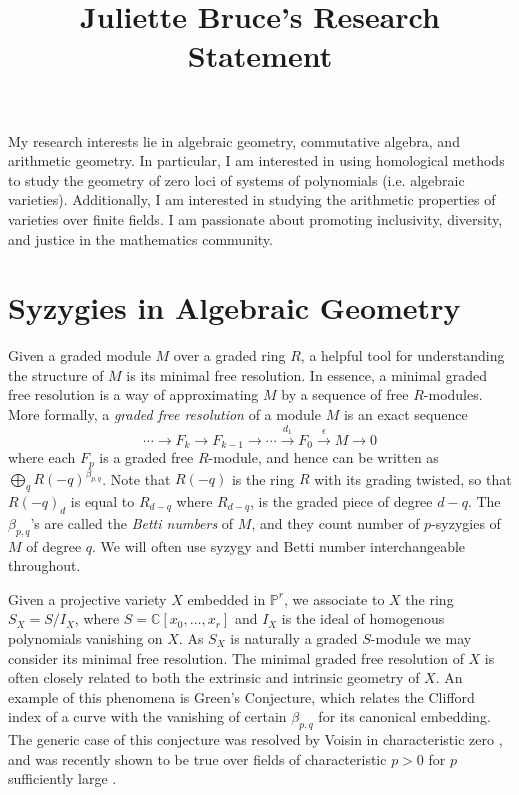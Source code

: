 \documentclass[10pt,reqno]{amsart}
\title{Juliette Bruce's Research Statement}
\theoremstyle{remark}
\newcommand{\C}{\mathbb{C}}
\renewcommand{\P}{\mathbb{P}}
\begin{document}
 

\maketitle



\setcounter{section}{0}

My research interests lie in algebraic geometry, commutative algebra, and arithmetic geometry. In particular, I am interested in using homological methods to study the geometry of zero loci of systems of polynomials (i.e. algebraic varieties). Additionally, I am interested in studying the arithmetic properties of varieties over finite fields. I am passionate about promoting inclusivity, diversity, and justice in the mathematics community.

\section{Syzygies in Algebraic Geometry}

Given a graded module $M$ over a graded ring $R$, a helpful tool for understanding the structure of $M$ is its minimal free resolution. In essence, a minimal graded free resolution is a way of approximating $M$ by a sequence of free $R$-modules. More formally, a \textit{graded free resolution} of a module $M$ is an exact sequence 
\[
\cdots \xrightarrow{} F_{k} \xrightarrow{} F_{k-1} \xrightarrow{} \cdots \xrightarrow{d_{1}} F_{0}\xrightarrow{\epsilon}M\xrightarrow{} 0
\]
where each $F_{p}$ is a graded free $R$-module, and hence can be written as $\bigoplus_{q}R(-q)^{\beta_{p,q}}$. Note that $R(-q)$ is the ring $R$ with its grading twisted, so that $R(-q)_{d}$ is equal to $R_{d-q}$ where $R_{d-q}$, is the graded piece of degree $d-q$. The $\beta_{p,q}$'s are called the \textit{Betti numbers} of $M$, and they count number of $p$-syzygies of $M$ of degree $q$. We will often use syzygy and Betti number interchangeable throughout. 

Given a projective variety $X$ embedded in $\P^r$, we associate to $X$ the ring $S_X=S/I_X$, where $S=\C[x_0,\ldots,x_r]$ and $I_X$ is the ideal of homogenous polynomials vanishing on $X$. As $S_X$ is naturally a graded $S$-module we may consider its minimal free resolution. The minimal graded free resolution of $X$ is often closely related to both the extrinsic and intrinsic geometry of $X$.  An example of this phenomena
 is Green's Conjecture, which relates the Clifford index of a curve with the vanishing of certain $\beta_{p,q}$ for its canonical embedding. The generic case of this conjecture was resolved by Voisin in characteristic zero \cite{voisin02, voisin05}, and was recently shown to be true over fields of characteristic $p>0$ for $p$ sufficiently large \cite{aproduFarkas19}.
\end{document}
